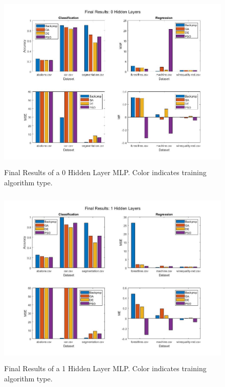 \documentclass[twoside,11pt]{article}
\begin{document}
	\begin{figure}[h]
		\centering
		\includegraphics[height=3.4in]{FINAL_FIGS/0_hl.jpg}
		\caption{Final Results of a 0 Hidden Layer MLP. Color indicates training algorithm type.}
		\label{0-hl}
	\end{figure}
	
	\begin{figure}[h]
		\centering
		\includegraphics[height=3.4in]{FINAL_FIGS/1_hl.jpg}
		\caption{Final Results of a 1 Hidden Layer MLP. Color indicates training algorithm type.}
		\label{1-hl}
	\end{figure}
	
\end{document}
